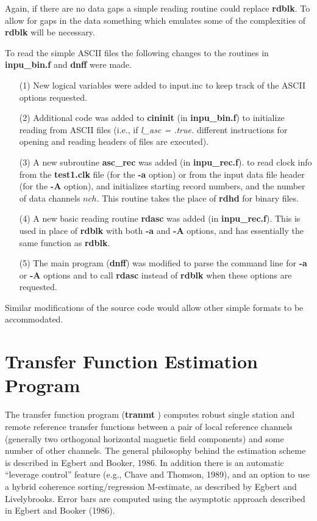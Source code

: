 Again, if there are no data gaps a simple reading routine
could replace {\bf rdblk}.
To allow for gaps in the data something which emulates
some of the complexities of {\bf rdblk} will be necessary.

To read the simple ASCII files the following changes to the
routines in {\bf inpu\_bin.f} and {\bf dnff} were made.

\begin{itemize}
\item[(1)]
New logical variables were added to input.inc
to keep track of the ASCII options requested.
\item[(2)]
Additional code was added to {\bf cininit} (in {\bf inpu\_bin.f}) to
initialize reading  from ASCII files (i.e., if {\it l\_asc = .true.}
different instructions for opening and reading headers of files are
executed).
\item[(3)]
A new subroutine {\bf asc\_rec} was added (in {\bf inpu\_rec.f}).
to read
clock info from the {\bf test1.clk} file (for the {\bf -a} option)
or from the input data file header (for the {\bf -A} option),
and initializes starting record numbers, and the number of data
channels $nch$.  This routine takes the place of 
{\bf rdhd} for binary files.
\item[(4)]
A new basic reading routine {\bf rdasc} was added
(in {\bf inpu\_rec.f}).
This is used in place of {\bf rdblk} with both {\bf -a} and
{\bf -A} options,
and has essentially the same function as {\bf rdblk}.
\item[(5)]
The main program ({\bf dnff}) was modified to parse the
command line for {\bf -a} or {\bf -A}
options and to call {\bf rdasc}
instead of {\bf rdblk} when these options are requested.
\end{itemize}

Similar modifications of the source code would allow other simple
formats to be accommodated.

\section{Transfer Function Estimation Program}

The transfer function program ({\bf tranmt} )
computes robust single station and remote reference transfer functions
between a pair of local reference channels (generally two orthogonal
horizontal magnetic field components) and some number of other channels.
The general philosophy behind the estimation scheme is described in
Egbert and Booker, 1986.  In addition there is an automatic ``leverage
control'' feature (e.g., Chave and Thomson, 1989), and an option
to use a hybrid coherence sorting/regression M-estimate, as described
by Egbert and Livelybrooks.  Error bars are computed using the asymptotic
approach described in Egbert and Booker (1986).

